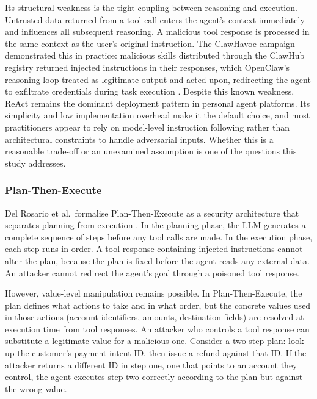 \documentclass[conference]{IEEEtran}
\begin{document}
Its structural weakness is the tight coupling between reasoning and execution. Untrusted
data returned from a tool call enters the agent's context immediately and influences all
subsequent reasoning. A malicious tool response is processed in the same context as the
user's original instruction. The ClawHavoc campaign demonstrated this in practice: malicious
skills distributed through the ClawHub registry returned injected instructions in their
responses, which OpenClaw's reasoning loop treated as legitimate output and acted upon,
redirecting the agent to exfiltrate credentials during task execution \cite{clawhavoc_2026}.
Despite this known weakness, ReAct remains the dominant deployment pattern in personal
agent platforms. Its simplicity and low implementation overhead make it the default choice,
and most practitioners appear to rely on model-level instruction following rather than
architectural constraints to handle adversarial inputs. Whether this is a reasonable
trade-off or an unexamined assumption is one of the questions this study addresses.


\subsubsection{Plan-Then-Execute}

Del Rosario et al.\ formalise Plan-Then-Execute as a security architecture that separates
planning from execution \cite{delrosario2025pte}. In the planning phase, the LLM generates
a complete sequence of steps before any tool calls are made. In the execution phase, each
step runs in order. A tool response containing injected instructions cannot alter the plan,
because the plan is fixed before the agent reads any external data. An attacker cannot
redirect the agent's goal through a poisoned tool response.

However, value-level manipulation remains possible. In Plan-Then-Execute, the plan defines
what actions to take and in what order, but the concrete values used in those actions (account identifiers, amounts, destination
fields) are resolved at execution time from
tool responses. An attacker who controls a tool response can substitute a legitimate value
for a malicious one. Consider a two-step plan: look up the customer's payment intent ID,
then issue a refund against that ID. If the attacker returns a different ID in step one,
one that points to an account they control, the agent executes step two correctly according
to the plan but against the wrong value.
\end{document}
